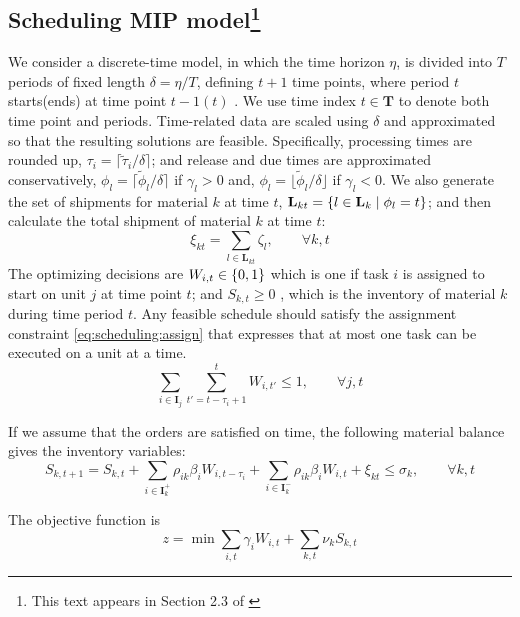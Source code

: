 \subsection{Scheduling MIP model\footnote{This text appears in Section 2.3 of
\citet{subramanian:maravelias:rawlings:2012}}}

 
We consider a discrete-time model, in which the time horizon $\eta$,
is divided into $T$ periods of fixed length $\delta = \eta/T$,
defining $t+1$ time points, where period $t$ starts(ends) at time
point $t-1(t)$ \citep{shah:pantelides:sargent:1993}. We use time index
$t \in \mathbf{T}$ to denote both time point and periods. Time-related
data are scaled using $\delta$ and approximated so that the resulting
solutions are feasible. Specifically, processing times are rounded up,
$\tau_i = \lceil \tilde{\tau}_i/\delta \rceil$; and release and due
times are approximated conservatively, $\phi_l = \lceil
\tilde{\phi}_l/\delta \rceil$ if $\gamma_l >0$ and, $\phi_l = \lfloor
\tilde{\phi}_l/\delta \rfloor$ if $\gamma_l <0$. We also generate the
set of shipments for material $k$ at time $t$, $\mathbf{L}_{kt} = \left\lbrace l
  \in \mathbf{L}_k \mid \phi_l=t \right\rbrace$; and then calculate the total
shipment of material $k$ at time $t$:
\[ \xi_{kt} = \sum_{l \in \mathbf{L}_{kt}} \zeta_l, \qquad \forall k,t
\]
The optimizing decisions are $W_{i,t} \in \left\lbrace 0,1 \right\rbrace$ which is one if
task $i$ is assigned to start on unit $j$ at time point $t$; and
$S_{k,t} \geq 0$ , which is the inventory of material $k$ during time
period $t$. Any feasible schedule should satisfy the assignment
constraint  \eqref{eq:scheduling:assign} that expresses that at most
one task can be executed on a  unit at a time.
\begin{equation}
\label{eq:scheduling:assign}
\sum_{i \in \mathbf{I}_j}\sum_{t'=t-\tau_i+1}^{t} W_{i,t'} \leq 1,
\qquad \forall j,t
\end{equation}

If we assume that the orders are satisfied on time, the following
material balance gives the inventory variables:
\begin{equation}
\label{eq:scheduling:inventoryBalance}
S_{k,t+1} = S_{k,t} + \sum_{i\in
  \mathbf{I}_k^+}\rho_{ik}\beta_iW_{i,t-\tau_i} + \sum_{i \in
  \mathbf{I}_k^-}\rho_{ik}\beta_iW_{i,t}+ \xi_{kt} \leq \sigma_{k},
\qquad \forall k,t
\end{equation}

The objective function is 
\begin{equation}
\label{eq:scheduling:objective}
z = \min_{}{\sum_{i,t} \gamma_i W_{i,t} + \sum_{k,t}\nu_kS_{k,t}}
\end{equation}

